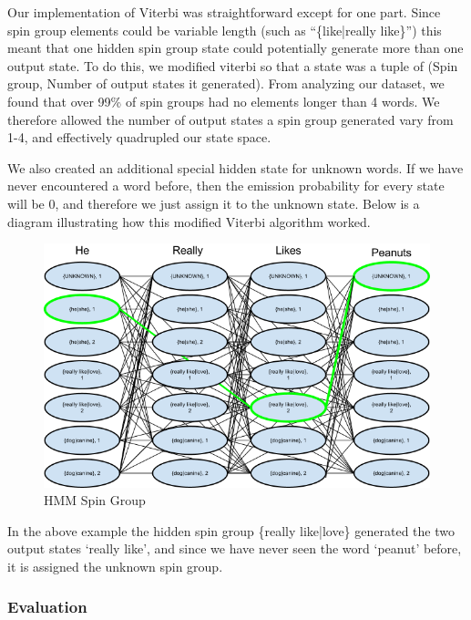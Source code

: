 \documentclass[11pt,letterpaper,oneside, titlepage]{scrartcl}
\begin{document}
Our implementation of Viterbi was straightforward except for one part. Since spin group elements could be variable length (such as ``\{like|really like\}”) this meant that one hidden spin group state could potentially generate more than one output state. To do this, we modified viterbi so that a state was a tuple of (Spin group, Number of output states it generated). From analyzing our dataset, we found that over 99\% of spin groups had no elements longer than 4 words. We therefore allowed the number of output states a spin group generated vary from 1-4, and effectively quadrupled our state space. 

We also created an additional special hidden state for unknown words. If we have never encountered a word before, then the emission probability for every state will be 0, and therefore we just assign it to the unknown state. Below is a diagram illustrating how this modified Viterbi algorithm worked.

\begin{figure}[h!]
  \centering
  \includegraphics[width=1\textwidth]{hmm_spin_group}
  \caption{HMM Spin Group}
  \label{fig:hmm_spin_group}
\end{figure}

\clearpage

In the above example the hidden spin group \{really like|love\} generated the two output states ‘really like’, and since we have never seen the word ‘peanut’ before, it is assigned the unknown spin group.

\subsubsection{Evaluation}
\end{document}
